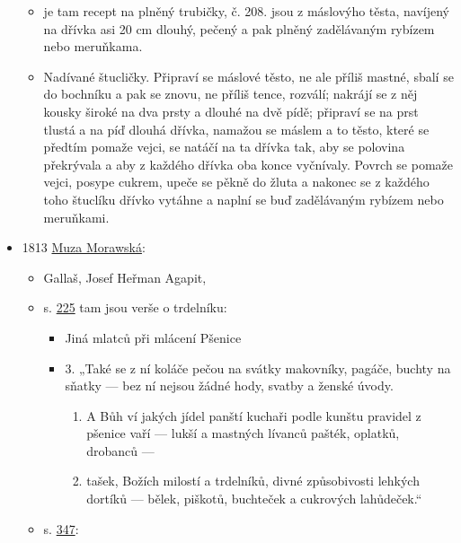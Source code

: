 \begin{itemize}
  \begin{itemize}
  \tightlist
  \item
    je tam recept na plněný trubičky, č. 208. jsou z máslovýho těsta,
    navíjený na dřívka asi 20 cm dlouhý, pečený a pak plněný zadělávaným
    rybízem nebo meruňkama.
  \item
    Nadívané štucličky. Připraví se máslové těsto, ne ale příliš mastné,
    sbalí se do bochníku a pak se znovu, ne příliš tence, rozválí;
    nakrájí se z něj kousky široké na dva prsty a dlouhé na dvě pídě;
    připraví se na prst tlustá a na píď dlouhá dřívka, namažou se máslem
    a to těsto, které se předtím pomaže vejci, se natáčí na ta dřívka
    tak, aby se polovina překrývala a aby z každého dřívka oba konce
    vyčnívaly. Povrch se pomaže vejci, posype cukrem, upeče se pěkně do
    žluta a nakonec se z každého toho štuclíku dřívko vytáhne a naplní
    se buď zadělávaným rybízem nebo meruňkami.
  \end{itemize}
\item
  1813
  \href{https://ndk.cz/view/uuid:c0247bb0-d3b5-11dc-b9b7-000d606f5dc6?page=uuid:f986d11e-aa9e-41c6-b183-52fcf3fc3f80}{Muza
  Morawská}:

  \begin{itemize}
  \tightlist
  \item
    Gallaš, Josef Heřman Agapit,
  \item
    s.
    \href{https://ndk.cz/view/uuid:c0247bb0-d3b5-11dc-b9b7-000d606f5dc6?page=uuid:c4c850d1-41c7-4c42-8940-f42f45196b76}{225}
    tam jsou verše o trdelníku:

    \begin{itemize}
    \tightlist
    \item
      Jiná mlatců při mlácení Pšenice
    \item
      3. „Také se z ní koláče pečou na svátky makovníky, pagáče, buchty
      na sňatky --- bez ní nejsou žádné hody, svatby a ženské úvody.

      \begin{enumerate}
      \tightlist
      \item
        A Bůh ví jakých jídel panští kuchaři podle kunštu pravidel z
        pšenice vaří --- lukší a mastných lívanců pašték, oplatků,
        drobanců ---
      \item
        tašek, Božích milostí a trdelníků, divné způsobivosti lehkých
        dortíků --- bělek, piškotů, buchteček a cukrových lahůdeček.``
      \end{enumerate}
    \end{itemize}
  \item
    s.
    \href{https://ndk.cz/view/uuid:c0247bb0-d3b5-11dc-b9b7-000d606f5dc6?page=uuid:7f1464d8-a54f-4f38-9c1e-70fa4c0285e1}{347}:


\end{itemize}
\end{itemize}
